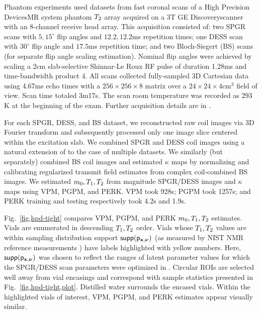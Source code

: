 Phantom experiments used datasets 
from fast coronal scans
of a High Precision Devices\regis MR system phantom $T_2$ array
acquired on a 3T GE Discovery\tmark scanner
with an 8-channel receive head array.
This acquisition consisted of: 
two SPGR scans 
with $5,15^\circ$ flip angles
and $12.2,12.2$ms repetition times;
one DESS scan 
with $30^\circ$ flip angle
and $17.5$ms repetition time;
and two Bloch-Siegert (BS) scans \cite{sacolick:10:bmb}
(for separate flip angle scaling estimation).
Nominal flip angles were achieved 
by scaling a 2cm slab-selective Shinnar-Le Roux RF pulse \cite{pauly:91:prf}
of duration 1.28ms and time-bandwidth product 4.
All scans collected fully-sampled 3D Cartesian data
using 4.67ms echo times
with a $256\times256\times8$ matrix
over a $24\times24\times4$cm$^3$ field of view. 
Scan time totaled 3m17s. 
The scan room temperature was recorded as $293$K
at the beginning of the exam. 
Further acquisition details are in \cite{nataraj:17:oms}.

For each SPGR, DESS, and BS dataset, 
we reconstructed raw coil images via 3D Fourier transform
and subsequently processed only one image slice
centered within the excitation slab.
We combined SPGR and DESS coil images 
using a natural extension of \cite{ying:07:jir}
to the case of multiple datasets.
We similarly (but separately) combined BS coil images
and estimated $\kappa$ maps
by normalizing and calibrating
regularized transmit field estimates \cite{sun:14:reo}
from complex coil-combined BS images.
We estimated $m_0,T_1,T_2$
from magnitude SPGR/DESS images and $\kappa$ maps
using VPM, PGPM, and PERK.
VPM took 928s;
PGPM took 1257s; 
and PERK training and testing
respectively took 4.2s and 1.9s.

Fig.~\ref{fig,hpd-tight} compares
VPM, PGPM, and PERK $m_0,T_1,T_2$ estimates.
Vials are enumerated in descending $T_1,T_2$ order.
Vials whose $T_1,T_2$ values
are within sampling distribution support $\supp{\dist{\bmx,\bmnu}}$
(as measured by NIST NMR reference measurements \cite{keenan:16:msm})
have labels highlighted
with yellow numbers.
Here, 
$\supp{\dist{\bmx,\bmnu}}$ was chosen 
to reflect the ranges of latent parameter values
for which the SPGR/DESS scan parameters 
were optimized in \cite{nataraj:17:oms}.
Circular ROIs are selected well away from vial encasings
and correspond with sample statistics 
presented in Fig.~\ref{fig,hpd-tight,plot}.                                                                                                                                                                                 
Distilled water surrounds the encased vials.
Within the highlighted vials of interest,
VPM, PGPM, and PERK estimates 
appear visually similar.

